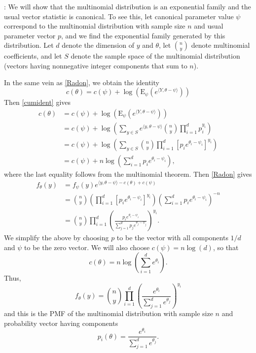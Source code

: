 \documentclass[
]{article}
\begin{document}
\vspace*{0.5cm}

: We will show that the
multinomial distribution is an exponential family and the usual vector
statistic is canonical. To see this, let canonical parameter value
\(\psi\) correspond to the multinomial distribution with sample size
\(n\) and usual parameter vector \(p\), and we find the exponential
family generated by this distribution. Let \(d\) denote the dimension of
\(y\) and \(\theta\), let \({n \choose y}\) denote multinomial
coefficients, and let \(S\) denote the sample space of the multinomial
distribution (vectors having nonnegative integer components that sum to
\(n\)).

In the same vein as \eqref{Radon}, we obtain the identity
\begin{equation} \label{cumident}
    c(\theta) = c(\psi) + \log\left(\mathrm{E}_{\psi}\left(e^{\langle Y, \theta - \psi \rangle}\right)\right)
\end{equation} Then \eqref{cumident} gives \begin{align*}
  c(\theta) &= c(\psi) + \log\left(\mathrm{E}_{\psi}\left(e^{\langle Y, \theta - \psi \rangle}\right)\right) \\
  &= c(\psi) + \log\left(\sum_{y\in S} e^{\langle y, \theta - \psi \rangle}{n \choose y} \prod_{i=1}^d p_i^{y_i}\right) \\
  &= c(\psi) + \log\left(\sum_{y\in S} {n \choose y} \prod_{i=1}^d \left[p_ie^{\theta_i - \psi_i}\right]^{y_i}\right) \\
  &= c(\psi) + n\log\left(\sum_{i=1}^d p_ie^{\theta_i - \psi_i}\right),
\end{align*} where the last equality follows from the multinomial
theorem. Then \eqref{Radon} gives \begin{align*}
  f_{\theta}(y) &= f_{\psi}(y)e^{\langle y,\theta-\psi \rangle - c(\theta) + c(\psi)} \\
    &= {n \choose y} \left(\prod_{i=1}^d\left[p_ie^{\theta_i-\psi_i}\right]^{y_i}\right)\left(\sum_{i=1}^d p_ie^{\theta_i-\psi_i}\right)^{-n} \\
    &= {n \choose y} \prod_{i=1}^d \left(\frac{p_ie^{\theta_i-\psi_i}}{\sum_{j=1}^dp_je^{\theta_j-\psi_j}}\right)^{y_i}.
\end{align*} We simplify the above by choosing \(p\) to be the vector
with all components \(1/d\) and \(\psi\) to be the zero vector. We will
also choose \(c(\psi) = n\log(d)\), so that \[
  c(\theta) = n\log\left(\sum_{i=1}^d e^{\theta_i}\right).
\] Thus, \[
  f_{\theta}(y) = {n \choose y}\prod_{i=1}^d \left(\frac{e^{\theta_i}}{\sum_{j=1}^d e^{\theta_j}}\right)^{y_i}
\] and this is the PMF of the multinomial distribution with sample size
\(n\) and probability vector having components \[
  p_i(\theta) = \frac{e^{\theta_i}}{\sum_{j=1}^d e^{\theta_j}}.
\]
\end{document}
